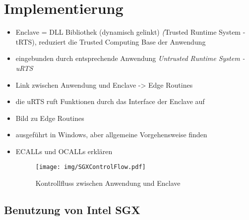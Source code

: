 
\chapter{Implementierung}
\begin{itemize}
	\item Enclave = DLL Bibliothek (dynamisch gelinkt) \textit(Trusted Runtime System -tRTS), reduziert die Trusted Computing Base der Anwendung
	\item eingebunden durch entsprechende Anwendung \textit{Untrusted Runtime System - uRTS}
	\item Link zwischen Anwendung und Enclave -> Edge Routines
	\item die uRTS ruft Funktionen durch das Interface der Enclave auf
	\item Bild zu Edge Routines
	\item ausgeführt in Windows, aber allgemeine Vorgehensweise finden
	\item ECALLs und OCALLs erklären
	
	\begin{figure}[h]
		\texttt{[image: img/SGXControlFlow.pdf]}
		\centering
		\caption{Kontrollfluss zwischen Anwendung und Enclave}
		\label{fig:sgxcontrolflow}
	\end{figure}
	
\end{itemize}

\section{Benutzung von Intel SGX}
